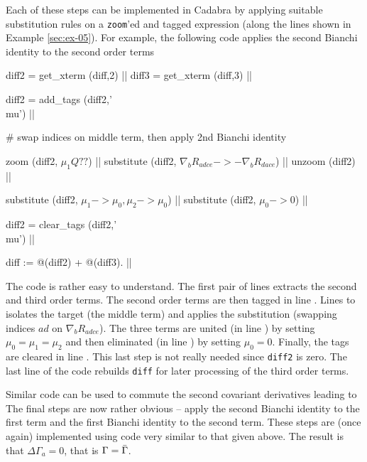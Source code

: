 \documentclass[a4paper,12pt]{article}
\numberwithin{equation}{section}%
\begin{document}
Each of these steps can be implemented in Cadabra by applying suitable substitution rules on
a \verb|zoom|'ed and tagged expression (along the lines shown in Example \ref{sec:ex-05}).
For example, the following code applies the second Bianchi identity to the second order terms
\begin{cadabra}
   diff2 = get_xterm (diff,2)            ||
   diff3 = get_xterm (diff,3)            ||

   diff2 = add_tags (diff2,'\\mu')       ||

   # swap indices on middle term, then apply 2nd Bianchi identity

   zoom       (diff2, $\mu_{1} Q??$)                                           ||
   substitute (diff2, $\nabla_{b}{R_{a d c e}} -> - \nabla_{b}{R_{d a c e}}$)  ||
   unzoom     (diff2)                                                          ||

   substitute (diff2, $\mu_{1} -> \mu_{0}, \mu_{2} -> \mu_{0}$)    ||
   substitute (diff2, $\mu_{0} -> 0$)                              ||

   diff2 = clear_tags (diff2,'\\mu')                               ||

   diff := @(diff2) + @(diff3).                                    ||
\end{cadabra}
The code is rather easy to understand. The first pair of lines extracts the second and third
order terms. The second order terms are then tagged in line . Lines
 to  isolates the target (the middle term) and applies
the substitution (swapping indices ${ad}$ on $\nabla_{b}R_{adce}$). The three terms are
united (in line ) by setting $\mu_{0}=\mu_{1}=\mu_{2}$ and then eliminated
(in line ) by setting $\mu_0 = 0$. Finally, the tags are cleared in line
. This last step is not really needed since \verb|diff2| is zero. The last
line of the code rebuilds \verb|diff| for later processing of the third order terms.

Similar code can be used to commute the second covariant derivatives leading to
 The final steps are now rather obvious --
apply the second Bianchi identity to the first term and the first Bianchi identity to the
second term. These steps are (once again) implemented using code very similar to that given
above. The result is that $\Delta\Gamma_{a}=0$, that is $\Gamma={\bar{\Gamma}}$.
\end{document}
